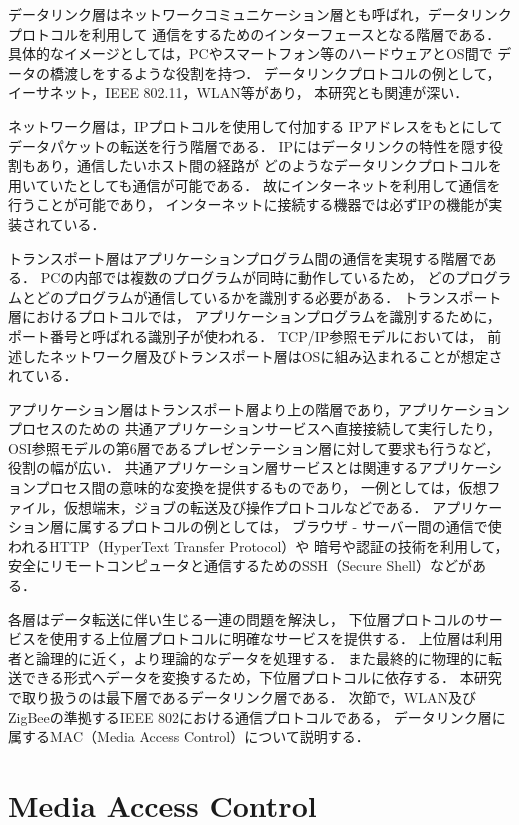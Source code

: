 \documentclass[12pt]{jreport}
\begin{document}
データリンク層はネットワークコミュニケーション層とも呼ばれ，データリンクプロトコルを利用して
通信をするためのインターフェースとなる階層である．
具体的なイメージとしては，PCやスマートフォン等のハードウェアとOS間で
データの橋渡しをするような役割を持つ．
データリンクプロトコルの例として，イーサネット，IEEE 802.11，WLAN等があり，
本研究とも関連が深い．

ネットワーク層は，IPプロトコルを使用して付加する
IPアドレスをもとにしてデータパケットの転送を行う階層である．
IPにはデータリンクの特性を隠す役割もあり，通信したいホスト間の経路が
どのようなデータリンクプロトコルを用いていたとしても通信が可能である．
故にインターネットを利用して通信を行うことが可能であり，
インターネットに接続する機器では必ずIPの機能が実装されている．

トランスポート層はアプリケーションプログラム間の通信を実現する階層である．
PCの内部では複数のプログラムが同時に動作しているため，
どのプログラムとどのプログラムが通信しているかを識別する必要がある．
トランスポート層におけるプロトコルでは，
アプリケーションプログラムを識別するために，ポート番号と呼ばれる識別子が使われる．
TCP/IP参照モデルにおいては，
前述したネットワーク層及びトランスポート層はOSに組み込まれることが想定されている．

アプリケーション層はトランスポート層より上の階層であり，アプリケーションプロセスのための
共通アプリケーションサービスへ直接接続して実行したり，
OSI参照モデルの第6層であるプレゼンテーション層に対して要求も行うなど，役割の幅が広い．
共通アプリケーション層サービスとは関連するアプリケーションプロセス間の意味的な変換を提供するものであり，
一例としては，仮想ファイル，仮想端末，ジョブの転送及び操作プロトコルなどである．
アプリケーション層に属するプロトコルの例としては，
ブラウザ - サーバー間の通信で使われるHTTP（HyperText Transfer Protocol）や
暗号や認証の技術を利用して，安全にリモートコンピュータと通信するためのSSH（Secure Shell）などがある．

各層はデータ転送に伴い生じる一連の問題を解決し，
下位層プロトコルのサービスを使用する上位層プロトコルに明確なサービスを提供する．
上位層は利用者と論理的に近く，より理論的なデータを処理する．
また最終的に物理的に転送できる形式へデータを変換するため，下位層プロトコルに依存する．
本研究で取り扱うのは最下層であるデータリンク層である．
次節で，WLAN及びZigBeeの準拠するIEEE 802における通信プロトコルである，
データリンク層に属するMAC（Media Access Control）について説明する．

\section{Media Access Control}
\label{sec:mac_protocol}
\end{document}
